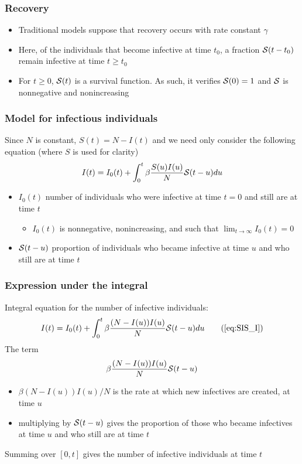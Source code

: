 \documentclass[aspectratio=169]{beamer}
\begin{document}
\begin{frame}\frametitle{Recovery}
\begin{itemize}
\item Traditional models suppose that recovery occurs with rate constant
$\gamma$
\vfill
\item Here, of the individuals that become
infective at time $t_0$, a fraction $\S(t-t_0)$ remain infective at
time $t\geq t_0$
\vfill
\item \imply\;
For $t\geq 0$, $\S(t)$ is a survival function. As such, it verifies
$\S(0)=1$ and $\S$ is nonnegative and nonincreasing
\end{itemize}
\end{frame}


\begin{frame}\frametitle{Model for infectious individuals}
Since $N$ is constant, $S(t)=N-I(t)$ and we need only
consider the following equation (where $S$ is used for clarity)
\begin{equation}
I(t) = I_0(t)+ \int_0^t\beta\frac{S(u)I(u)}{N} \S(t-u) du
\label{eq:SIS_I} 
\end{equation}
\vfill
\begin{itemize}
\item $I_0(t)$ number of individuals who were infective at time
$t=0$ and still are at time $t$
\begin{itemize}
\item $I_0(t)$ is nonnegative, nonincreasing, and
such that $\lim_{t\to\infty}I_0(t)=0$
\end{itemize}
\item $\S(t-u)$ proportion of individuals who became infective at time $u$ and who still are at time $t$
\end{itemize}
\end{frame}


\begin{frame}\frametitle{Expression under the integral}
Integral equation for the number of infective individuals: 
\begin{equation}
I(t) = I_0(t)+ \int_0^t\beta\frac{(N-I(u))I(u)}{N} \S(t-u) du
\tag{\ref{eq:SIS_I}} 
\end{equation}
The term
\[
\beta\frac{(N-I(u))I(u)}{N} \S(t-u)
\]
\begin{itemize}
\item $\beta (N-I(u))I(u)/N$ is the rate at which new infectives are created, at time $u$
\item multiplying by $\S(t-u)$ gives the proportion of those who became
infectives at time $u$ and who still are at time $t$
\end{itemize}
Summing over $[0,t]$ gives the number of infective individuals at time $t$
\end{frame}
\end{document}
